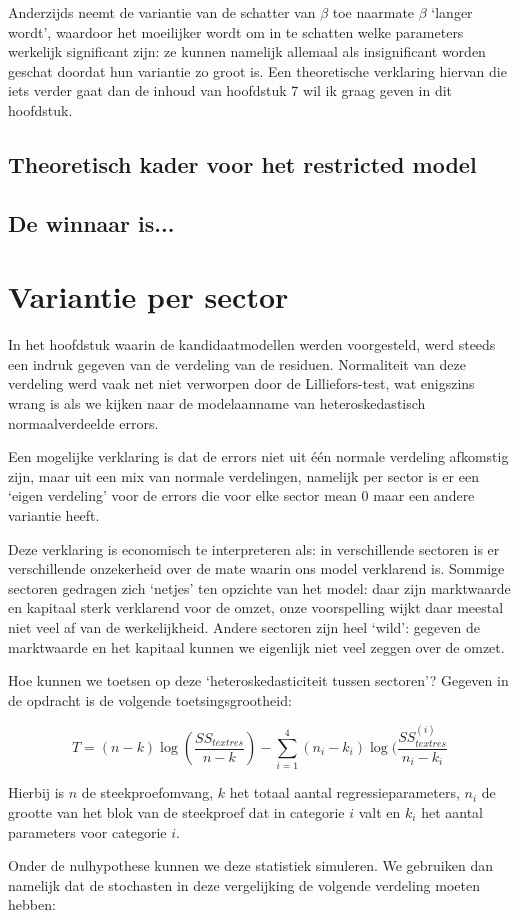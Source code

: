 \documentclass[a4paper, notitlepage]{report}
\begin{document}
  Anderzijds neemt de variantie van de schatter van $\beta$ toe naarmate $\beta$ `langer wordt', waardoor het moeilijker wordt om in te schatten welke parameters werkelijk significant zijn: ze kunnen namelijk allemaal als insignificant worden geschat doordat hun variantie zo groot is. Een theoretische verklaring hiervan die iets verder gaat dan de inhoud van hoofdstuk 7 wil ik graag geven in dit hoofdstuk.
  
\section{Theoretisch kader voor het restricted model}
  
\section{De winnaar is...}
  
\chapter*{Variantie per sector}
  In het hoofdstuk waarin de kandidaatmodellen werden voorgesteld, werd steeds een indruk gegeven van de verdeling van de residuen. Normaliteit van deze verdeling werd vaak net niet verworpen door de Lilliefors-test, wat enigszins wrang is als we kijken naar de modelaanname van heteroskedastisch normaalverdeelde errors.
  
  Een mogelijke verklaring is dat de errors niet uit \' e\' en normale verdeling afkomstig zijn, maar uit een mix van normale verdelingen, namelijk per sector is er een `eigen verdeling' voor de errors die voor elke sector mean 0 maar een andere variantie heeft.
  
  Deze verklaring is economisch te interpreteren als: in verschillende sectoren is er verschillende onzekerheid over de mate waarin ons model verklarend is. Sommige sectoren gedragen zich `netjes' ten opzichte van het model: daar zijn marktwaarde en kapitaal sterk verklarend voor de omzet, onze voorspelling wijkt daar meestal niet veel af van de werkelijkheid. Andere sectoren zijn heel `wild': gegeven de marktwaarde en het kapitaal kunnen we eigenlijk niet veel zeggen over de omzet.
  
  Hoe kunnen we toetsen op deze `heteroskedasticiteit tussen sectoren'? Gegeven in de opdracht is de volgende toetsingsgrootheid:
  
  \begin{equation*}
    T = (n-k)\log(\frac{SS_{text{res}}}{n-k}) - \sum_{i=1}^4 (n_i-k_i)\log(\frac{SS_{text{res}}^{(i)}}{n_i-k_i}
  \end{equation*}

  Hierbij is $n$ de steekproefomvang, $k$ het totaal aantal regressieparameters, $n_i$ de grootte van het blok van de steekproef dat in categorie $i$ valt en $k_i$ het aantal parameters voor categorie $i$.
	
	Onder de nulhypothese kunnen we deze statistiek simuleren. We gebruiken dan namelijk dat de stochasten in deze vergelijking de volgende verdeling moeten hebben:
	
	
\end{document}
